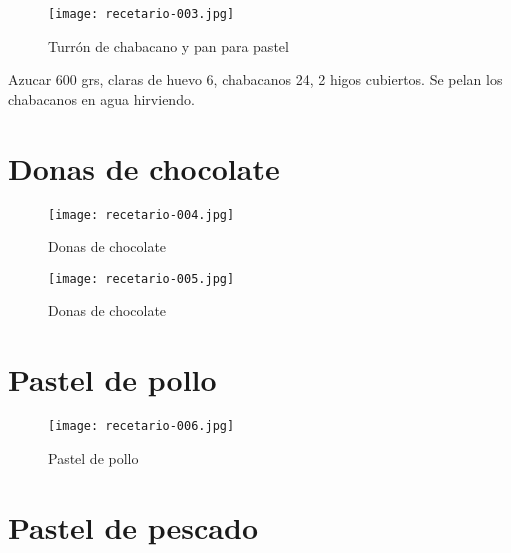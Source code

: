 \documentclass[12pt,letterpaper]{article}
\begin{document}
\begin{figure}[H] 
  \vspace{2pt}
    \texttt{[image: recetario-003.jpg]}
    \caption{Turrón de chabacano y pan para pastel}
   
\end{figure}

\begin{multicols}{2}
  
Azucar 600 grs, claras de huevo 6, chabacanos 24, 2 higos cubiertos. 
Se pelan los chabacanos en agua hirviendo.
  
  
\end{multicols}

\newpage

\section{Donas de chocolate}

  \begin{figure}[H]
    \vspace{2pt}
  \texttt{[image: recetario-004.jpg]}
    \caption{Donas de chocolate}
    
  \end{figure}


  

  \begin{figure}
    \vspace{2pt}
  \texttt{[image: recetario-005.jpg]}
    \caption{Donas de chocolate}
    
  \end{figure}


\newpage

\section{Pastel de pollo}

  \begin{figure}[H]
    \vspace{2pt}
  \texttt{[image: recetario-006.jpg]}
    \caption{Pastel de pollo}
    
  \end{figure}

\newpage

  \section{Pastel de pescado}
  
\end{document}
